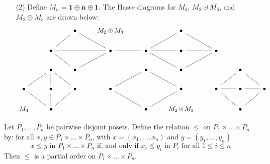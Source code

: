 \begin{example}
\begin{enumerate}
    \item[(2)] Define $M_n=\textbf{1} \oplus \bar{\textbf{n}} \oplus
      \textbf{1}$. The Hasse diagrams for $M_3$, $M_2 \uplus M_3$, and
      $M_2 \oplus M_3$ are drawn below:
      \[\begin{tikzcd}
        && \bullet & {M_2 \oplus M_3} && \bullet \\
        & \bullet && \bullet & \bullet & \bullet & \bullet \\
        & \bullet & \bullet && \bullet & \bullet && \bullet \\
        \bullet & \bullet & \bullet & \bullet && \bullet & \bullet & \bullet & \bullet \\
        {M_3} & \bullet &&& \bullet & {M_2 \uplus M_3} && \bullet
        \arrow[no head, from=1-3, to=2-2]
        \arrow[no head, from=1-6, to=2-7]
        \arrow[no head, from=2-2, to=2-4]
        \arrow[no head, from=2-2, to=3-3]
        \arrow[no head, from=2-4, to=1-3]
        \arrow[no head, from=2-4, to=2-5]
        \arrow[no head, from=2-5, to=1-6]
        \arrow[no head, from=2-5, to=2-6]
        \arrow[no head, from=2-6, to=2-7]
        \arrow[no head, from=2-7, to=3-6]
        \arrow[no head, from=3-2, to=4-1]
        \arrow[no head, from=3-3, to=2-4]
        \arrow[no head, from=3-5, to=4-4]
        \arrow[no head, from=3-6, to=2-5]
        \arrow[no head, from=3-8, to=4-7]
        \arrow[no head, from=4-1, to=5-2]
        \arrow[no head, from=4-2, to=3-2]
        \arrow[no head, from=4-3, to=3-2]
        \arrow[no head, from=4-4, to=5-5]
        \arrow[no head, from=4-6, to=3-5]
        \arrow[no head, from=4-7, to=4-8]
        \arrow[no head, from=4-7, to=5-8]
        \arrow[no head, from=4-8, to=4-9]
        \arrow[no head, from=4-9, to=3-8]
        \arrow[no head, from=5-2, to=4-2]
        \arrow[no head, from=5-2, to=4-3]
        \arrow[no head, from=5-5, to=4-6]
        \arrow[no head, from=5-8, to=4-9]
      \end{tikzcd}\]
  \end{enumerate}
\end{example}

\begin{proposition}\label{proposition_1.5.4}
  Let $P_1, \dots, P_n$ be pairwise disjoint posets. Define the
  relation $\leq$ on $P_1 \times \dots \times P_n$ by: for all $x,y \in
  P_1 \times \dots \times P_n$, with $x=(x_1, \dots, x_n)$ and
  $y=(y_1, \dots, y_n)$
  \begin{equation*}
    x \leq y \text{ in } P_1 \times \dots \times P_n \text{ if, and only if }
    x_i \leq y_i \text{ in } P_i \text{ for all } 1 \leq i \leq n
  \end{equation*}
  Then $\leq$ is a partial order on  $P_1 \times \dots \times P_n$.
\end{proposition}

